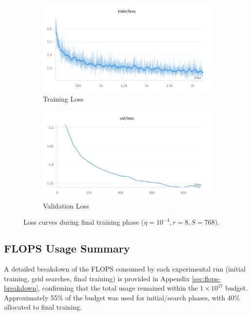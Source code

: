 \documentclass{article}
\begin{document}
\begin{figure}[!htbp]
    \centering
    \begin{subfigure}[b]{0.48\linewidth} \centering
        \includegraphics[width=\linewidth]{M2 Course Work/Images/final_training_loss.png}
        \caption{Training Loss} \label{fig:final_training_train_loss}
    \end{subfigure} \hfill
    \begin{subfigure}[b]{0.48\linewidth} \centering
        \includegraphics[width=\linewidth]{M2 Course Work/Images/final_validation_loss.png}
        \caption{Validation Loss} \label{fig:final_training_valid_loss}
    \end{subfigure}
    \caption{Loss curves during final training phase ($\eta=10^{-4}, r=8, S=768$).} %
    \label{fig:final_training_loss_curves}
\end{figure}


\subsection{FLOPS Usage Summary}
A detailed breakdown of the FLOPS consumed by each experimental run (initial training, grid searches, final training) is provided in Appendix \ref{sec:flops-breakdown}, confirming that the total usage remained within the $1 \times 10^{17}$ budget. Approximately 55\% of the budget was used for initial/search phases, with 40\% allocated to final training.
\end{document}

